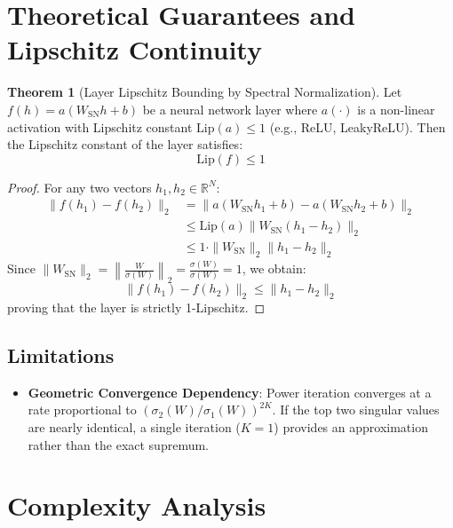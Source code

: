 \documentclass[11pt,a4paper]{article}
\theoremstyle{definition}
\newtheorem{theorem}{Theorem}[section]
\begin{document}
\section{Theoretical Guarantees and Lipschitz Continuity}

\begin{theorem}[Layer Lipschitz Bounding by Spectral Normalization]
Let $f(h) = a(W_{\text{SN}} h + b)$ be a neural network layer where $a(\cdot)$ is a non-linear activation with Lipschitz constant $\text{Lip}(a) \le 1$ (e.g., ReLU, LeakyReLU). Then the Lipschitz constant of the layer satisfies:
\begin{equation}
\text{Lip}(f) \le 1
\end{equation}
\end{theorem}

\begin{proof}
For any two vectors $h_1, h_2 \in \mathbb{R}^N$:
\begin{align}
\|f(h_1) - f(h_2)\|_2 &= \|a(W_{\text{SN}} h_1 + b) - a(W_{\text{SN}} h_2 + b)\|_2 \\
&\le \text{Lip}(a) \|W_{\text{SN}}(h_1 - h_2)\|_2 \\
&\le 1 \cdot \|W_{\text{SN}}\|_2 \|h_1 - h_2\|_2
\end{align}
Since $\|W_{\text{SN}}\|_2 = \left\| \frac{W}{\sigma(W)} \right\|_2 = \frac{\sigma(W)}{\sigma(W)} = 1$, we obtain:
\begin{equation}
\|f(h_1) - f(h_2)\|_2 \le \|h_1 - h_2\|_2
\end{equation}
proving that the layer is strictly 1-Lipschitz.
\end{proof}

\subsection{Limitations}
\begin{itemize}
    \item \textbf{Geometric Convergence Dependency}: Power iteration converges at a rate proportional to $(\sigma_2(W) / \sigma_1(W))^{2K}$. If the top two singular values are nearly identical, a single iteration ($K=1$) provides an approximation rather than the exact supremum.
\end{itemize}

\section{Complexity Analysis}
\end{document}
